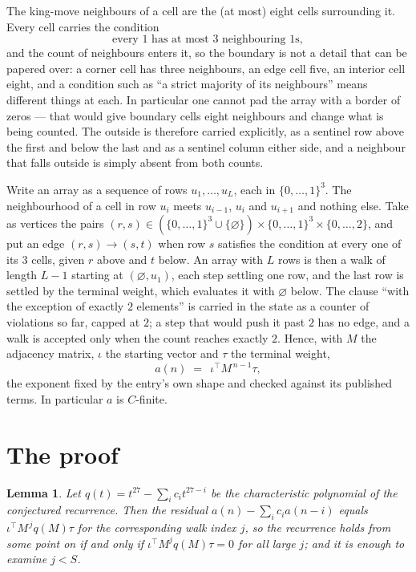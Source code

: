 \documentclass[11pt,a4paper]{article}
\theoremstyle{plain}
\newtheorem{lemma}[theorem]{Lemma}
\theoremstyle{definition}
\begin{document}
The king-move neighbours of a cell are the (at most) eight cells surrounding it. Every cell
carries the condition
\[
\text{every }1\text{ has at most }3\text{ neighbouring }1\text{s},
\]
and the count of neighbours enters it, so the boundary is not a detail that can be papered
over: a corner cell has three neighbours, an edge cell five, an interior cell eight, and a
condition such as ``a strict majority of its neighbours'' means different things at each. In
particular one cannot pad the array with a border of zeros --- that would give boundary cells
eight neighbours and change what is being counted. The outside is therefore carried
explicitly, as a sentinel row above the first and below the last and as a sentinel column
either side, and a neighbour that falls outside is simply absent from both counts.

Write an array as a sequence of rows $u_1,\dots,u_L$, each in
$\{0,\dots,1\}^{3}$. The neighbourhood of a cell in row $u_i$ meets $u_{i-1}$,
$u_i$ and $u_{i+1}$ and nothing else. Take as vertices the pairs
$(r,s)\in(\{0,\dots,1\}^{3}\cup\{\varnothing\})\times\{0,\dots,1\}^{3} \times \{0,\dots,2\}$,
and put an edge $(r,s)\to(s,t)$ when row $s$ satisfies the condition at every one of its
$3$ cells, given $r$ above and $t$ below. An array with $L$ rows is then a walk of length
$L-1$ starting at $(\varnothing,u_1)$, each step settling one row, and the last row is
settled by the terminal weight, which evaluates it with $\varnothing$ below. The clause ``with the exception of exactly $2$ elements'' is carried in
the state as a counter of violations so far, capped at $2$; a step that would push it past
$2$ has no edge, and a walk is accepted only when the count reaches exactly $2$. Hence,
with $M$ the adjacency matrix, $\iota$ the starting vector and $\tau$ the terminal weight,
\[
a(n)\;=\;\,\iota^{\!\top}M^{\,n-1}\tau ,
\]
the exponent fixed by the entry's own shape and checked against its published terms. In
particular $a$ is $C$-finite.

\section{The proof}

\begin{lemma}\label{lem:crit}
Let $q(t)=t^{27}-\sum_i c_it^{27-i}$ be the characteristic polynomial of the
conjectured recurrence. Then the residual $a(n)-\sum_ic_ia(n-i)$ equals
$\iota^{\!\top}M^{\,j}q(M)\tau$ for the corresponding walk index $j$, so the
recurrence holds from some point on if and only if $\iota^{\!\top}M^{j}q(M)\tau=0$ for all
large $j$; and it is enough to examine $j<S$.
\end{lemma}
\end{document}
